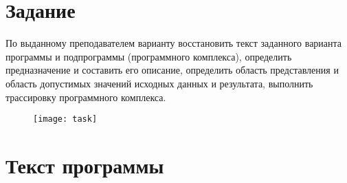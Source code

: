 \tableofcontents

\newpage

\section{Задание}
По выданному преподавателем варианту восстановить текст заданного варианта программы и подпрограммы (программного комплекса), определить предназначение и составить его описание, определить область представления и область допустимых значений исходных данных и результата, выполнить трассировку программного комплекса.

\begin{figure}[H]
\centering
\texttt{[image: task]}
\label{pic:task}
\end{figure}


\section{Текст программы}
